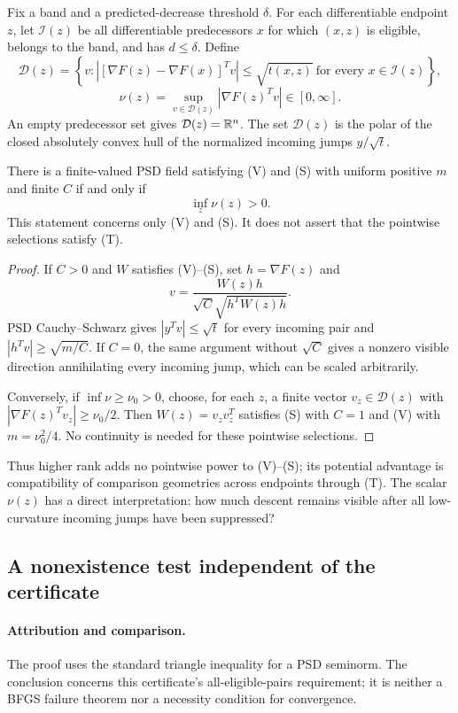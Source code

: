 Fix a band and a predicted-decrease threshold $\delta$. For each differentiable endpoint $z$, let $\mathcal I(z)$ be all differentiable predecessors $x$ for which $(x,z)$ is eligible, belongs to the band, and has $d\le\delta$. Define
\[
 \mathcal D(z)=\left\{v:\left|[\nabla F(z)-\nabla F(x)]^Tv\right|
       \le\sqrt{t(x,z)}\ \text{for every }x\in\mathcal I(z)\right\},
\]
\begin{equation}
 \nu(z)=\sup_{v\in\mathcal D(z)}|\nabla F(z)^Tv|\in[0,\infty]. \label{G:eq:nu}
\end{equation}
An empty predecessor set gives $\mathcal D(z)=\mathbb R^n$. The set $\mathcal D(z)$ is the polar of the closed absolutely convex hull of the normalized incoming jumps $y/\sqrt t$.

\begin{proposition}
There is a finite-valued PSD field satisfying (V) and (S) with uniform positive $m$ and finite $C$ if and only if
\[
 \inf_z\nu(z)>0.
\]
This statement concerns only (V) and (S). It does not assert that the pointwise selections satisfy (T).
\end{proposition}
\begin{proof}
If $C>0$ and $W$ satisfies (V)--(S), set $h=\nabla F(z)$ and
\[
 v=\frac{W(z)h}{\sqrt C\sqrt{h^TW(z)h}}.
\]
PSD Cauchy--Schwarz gives $|y^Tv|\le\sqrt t$ for every incoming pair and
$|h^Tv|\ge\sqrt{m/C}$. If $C=0$, the same argument without $\sqrt C$ gives a nonzero visible direction annihilating every incoming jump, which can be scaled arbitrarily.

Conversely, if $\inf\nu\ge\nu_0>0$, choose, for each $z$, a finite vector $v_z\in\mathcal D(z)$ with $|\nabla F(z)^Tv_z|\ge\nu_0/2$. Then $W(z)=v_zv_z^T$ satisfies (S) with $C=1$ and (V) with $m=\nu_0^2/4$. No continuity is needed for these pointwise selections.
\end{proof}
Thus higher rank adds no pointwise power to (V)--(S); its potential advantage is compatibility of comparison geometries across endpoints through (T). The scalar $\nu(z)$ has a direct interpretation: how much descent remains visible after all low-curvature incoming jumps have been suppressed?

\subsection{A nonexistence test independent of the certificate}
\paragraph{Attribution and comparison.}
The proof uses the standard triangle inequality for a PSD seminorm. The conclusion concerns this certificate's all-eligible-pairs requirement; it is neither a BFGS failure theorem nor a necessity condition for convergence.

